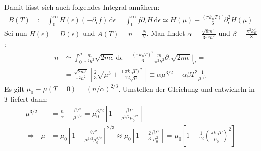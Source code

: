 \documentclass[a4paper,12pt]{article}
\newcommand{\intx}{}
\newcommand{\kla}{}
\newcommand{\klam}{}
\begin{document}
Damit lässt sich auch folgendes Integral annähern:
\begin{align*}
B(T)&:=\intx\int_{0}^{\infty}H(\epsilon)(-\partial_\epsilon f)\,\mathrm{d}\epsilon =\intx\int_{0}^{\infty}f\partial_\epsilon H\,\mathrm{d}\epsilon\simeq H(\mu) +\frac{(\pi k_BT)^2}{6}\partial_\epsilon^2H(\mu)
\end{align*}
Sei nun $H(\epsilon)=D(\epsilon)$ und $A(T)=n=\frac{N}{V}$. Man findet $\alpha = \frac{\sqrt{8m^3}}{3\pi^2\hbar^2}$ und $\beta = \frac{\pi^2k_B^2}{8}$:
\begin{align*}
n&\simeq\intx\int_{0}^{\mu}\frac{m}{\pi^2\hbar^2}\sqrt{2m\epsilon}\,\mathrm{d}\epsilon +\frac{(\pi k_BT)^2}{6}\frac{m}{\pi^2\hbar^2}\partial_\epsilon\sqrt{2m\epsilon}\bigg\vert_\mu=\\
&=\frac{\sqrt{2m^3}}{\pi^2\hbar^2}\klam\left[ {\frac{2}{3}\sqrt{\mu^3}+\frac{(\pi k_BT)^2}{12\sqrt{\mu}}} \right]\equiv\alpha \mu^{3/2}+\alpha\beta T^2\frac{1}{\mu^{1/2}}
\end{align*}Es gilt $\mu_0\equiv \mu (T=0)=(n/\alpha)^{2/3}$. Umstellen der Gleichung und entwickeln in $T$ liefert dann:
\begin{align*}
\mu^{3/2}&=\frac{n}{\alpha}-\frac{\beta T^2}{\mu^{1/2}}=\mu_0^{3/2}\klam\left[ {1-\frac{\beta T^2}{\mu^{1/2}\mu_0^{3/2}}} \right]\\
\Rightarrow\ \ \ \mu&=\mu_0\klam\left[ {1-\frac{\beta T^2}{\mu^{1/2}\mu_0^{3/2}}} \right]^{2/3}\approx\mu_0\klam\left[ {1-\frac{2}{3}\frac{\beta T^2}{\mu_0^2 }} \right]=\mu_0\klam\left[ {1-\frac{1}{12}\kla\left( {\frac{\pi k_BT}{\mu_0}} \right)^2} \right]
\end{align*}
\end{document}
